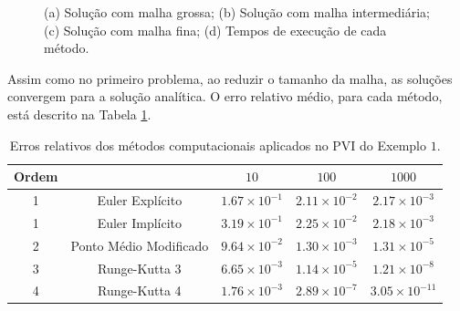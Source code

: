 \begin{figure}[H]
{		
	}
	\caption{(a) Solução com malha grossa; (b) Solução com malha intermediária; (c) Solução com malha fina; (d) Tempos de execução de cada método. }
    \label{img:carry_plots}
\end{figure}

Assim como no primeiro problema, ao reduzir o tamanho da malha, as soluções convergem para a solução analítica. O erro relativo médio, para cada método, está descrito na Tabela \ref{tab:carry_relative_errors}.

\begin{table}\label{tabela-carry}
	\centering
	\begin{tabular}{|c|c|c|c|c|}
		\hline
		Ordem & \backslashbox{Método}{Pontos} & $10$                   & $100$                  & $1000$                 \\
		\hline
        \rule{0pt}{3ex} 
		1&Euler Explícito & $1.67 \times 10^{-1}$ & $2.11 \times 10^{-2}$ & $2.17 \times 10^{-3}$ \\ \rule{0pt}{3ex}
        1&Euler Implícito & $3.19 \times 10^{-1}$ & $2.25 \times 10^{-2}$ & $2.18 \times 10^{-3}$ \\ \rule{0pt}{3ex}
        2&Ponto Médio Modificado & $9.64 \times 10^{-2}$ & $1.30 \times 10^{-3}$ & $1.31 \times 10^{-5}$ \\ \rule{0pt}{3ex}
        3&Runge-Kutta 3 & $6.65 \times 10^{-3}$ & $1.14 \times 10^{-5}$ & $1.21 \times 10^{-8}$ \\ \rule{0pt}{3ex}
        4&Runge-Kutta 4 & $1.76 \times 10^{-3}$ & $2.89 \times 10^{-7}$ & $3.05 \times 10^{-11}$ \\
		\hline
		
	\end{tabular}
 \caption{Erros relativos dos métodos computacionais aplicados no PVI do Exemplo $1$.}
 \label{tab:carry_relative_errors}
\end{table}

